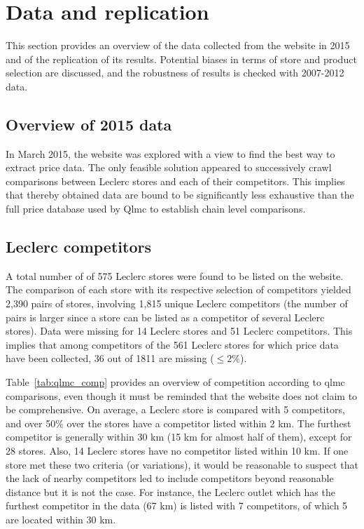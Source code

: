 \documentclass[11pt]{article}
\begin{document}
\section{Data and replication}

This section provides an overview of the data collected from the website in 2015 and of the replication of its results. Potential biases in terms of store and product selection are discussed, and the robustness of results is checked with 2007-2012 data.

\subsection{Overview of 2015 data}

In March 2015, the website was explored with a view to find the best way to extract price data. The only feasible solution appeared to successively crawl comparisons between Leclerc stores and each of their competitors. This implies that thereby obtained data are bound to be significantly less exhaustive than the full price database used by Qlmc to establish chain level comparisons.

\subsection{Leclerc competitors}

A total number of of 575 Leclerc stores were found to be listed on the website. The comparison of each store with its respective selection of competitors yielded 2,390 pairs of stores, involving 1,815 unique Leclerc competitors (the number of pairs is larger since a store can be listed as a competitor of several Leclerc stores). Data were missing for 14 Leclerc stores and 51 Leclerc competitors. This implies that among competitors of the 561 Leclerc stores for which price data have been collected, 36 out of 1811 are missing ($\le 2 \%$).

Table~\ref{tab:qlmc_comp} provides an overview of competition according to qlmc comparisons, even though it must be reminded that the website does not claim to be comprehensive. On average, a Leclerc store is compared with 5 competitors, and over 50\% over the stores have a competitor listed within 2 km. The furthest competitor is generally within 30 km (15 km for almost half of them), except for 28 stores. Also, 14 Leclerc stores have no competitor listed within 10 km. If one store met these two criteria (or variations), it would be reasonable to suspect that the lack of nearby competitors led to include competitors beyond reasonable distance but it is not the case. For instance, the Leclerc outlet which has the furthest competitor in the data (67 km) is listed with 7 competitors, of which 5 are located within 30 km.
\end{document}
